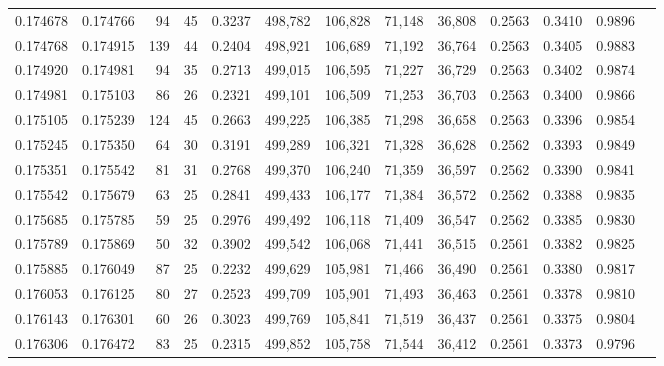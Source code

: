 \begin{tabular}{rrrrrrrrrrrrr}
0.174678 & 0.174766 &    94 &  45 &                                     0.3237 & 498,782 & 106,828 &  71,148 &  36,808 & 0.2563 & 0.3410 & 0.9896 \\
0.174768 & 0.174915 &   139 &  44 &                                     0.2404 & 498,921 & 106,689 &  71,192 &  36,764 & 0.2563 & 0.3405 & 0.9883 \\
0.174920 & 0.174981 &    94 &  35 &                                     0.2713 & 499,015 & 106,595 &  71,227 &  36,729 & 0.2563 & 0.3402 & 0.9874 \\
0.174981 & 0.175103 &    86 &  26 &                                     0.2321 & 499,101 & 106,509 &  71,253 &  36,703 & 0.2563 & 0.3400 & 0.9866 \\
0.175105 & 0.175239 &   124 &  45 &                                     0.2663 & 499,225 & 106,385 &  71,298 &  36,658 & 0.2563 & 0.3396 & 0.9854 \\
0.175245 & 0.175350 &    64 &  30 &                                     0.3191 & 499,289 & 106,321 &  71,328 &  36,628 & 0.2562 & 0.3393 & 0.9849 \\
0.175351 & 0.175542 &    81 &  31 &                                     0.2768 & 499,370 & 106,240 &  71,359 &  36,597 & 0.2562 & 0.3390 & 0.9841 \\
0.175542 & 0.175679 &    63 &  25 &                                     0.2841 & 499,433 & 106,177 &  71,384 &  36,572 & 0.2562 & 0.3388 & 0.9835 \\
0.175685 & 0.175785 &    59 &  25 &                                     0.2976 & 499,492 & 106,118 &  71,409 &  36,547 & 0.2562 & 0.3385 & 0.9830 \\
0.175789 & 0.175869 &    50 &  32 &                                     0.3902 & 499,542 & 106,068 &  71,441 &  36,515 & 0.2561 & 0.3382 & 0.9825 \\
0.175885 & 0.176049 &    87 &  25 &                                     0.2232 & 499,629 & 105,981 &  71,466 &  36,490 & 0.2561 & 0.3380 & 0.9817 \\
0.176053 & 0.176125 &    80 &  27 &                                     0.2523 & 499,709 & 105,901 &  71,493 &  36,463 & 0.2561 & 0.3378 & 0.9810 \\
0.176143 & 0.176301 &    60 &  26 &                                     0.3023 & 499,769 & 105,841 &  71,519 &  36,437 & 0.2561 & 0.3375 & 0.9804 \\
0.176306 & 0.176472 &    83 &  25 &                                     0.2315 & 499,852 & 105,758 &  71,544 &  36,412 & 0.2561 & 0.3373 & 0.9796 \\

\end{tabular}
